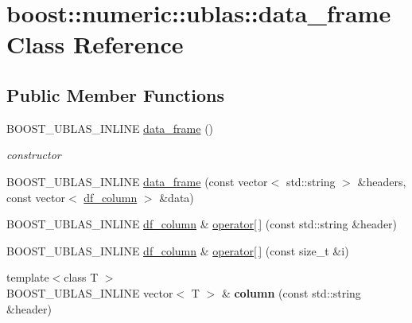 \hypertarget{classboost_1_1numeric_1_1ublas_1_1data__frame}{}\section{boost\+:\+:numeric\+:\+:ublas\+:\+:data\+\_\+frame Class Reference}
\label{classboost_1_1numeric_1_1ublas_1_1data__frame}
\subsection*{Public Member Functions}
\begin{DoxyCompactItemize}
\item 
B\+O\+O\+S\+T\+\_\+\+U\+B\+L\+A\+S\+\_\+\+I\+N\+L\+I\+NE \hyperlink{classboost_1_1numeric_1_1ublas_1_1data__frame_a1fe0c252f16d65762717c1da13432e8f}{data\+\_\+frame} ()\hypertarget{classboost_1_1numeric_1_1ublas_1_1data__frame_a1fe0c252f16d65762717c1da13432e8f}{}\label{classboost_1_1numeric_1_1ublas_1_1data__frame_a1fe0c252f16d65762717c1da13432e8f}

\begin{DoxyCompactList}\small\item\em constructor \end{DoxyCompactList}\item 
B\+O\+O\+S\+T\+\_\+\+U\+B\+L\+A\+S\+\_\+\+I\+N\+L\+I\+NE \hyperlink{classboost_1_1numeric_1_1ublas_1_1data__frame_a1cfb2a3083283f2aceff85649120ce61}{data\+\_\+frame} (const vector$<$ std\+::string $>$ \&headers, const vector$<$ \hyperlink{classboost_1_1numeric_1_1ublas_1_1df__column}{df\+\_\+column} $>$ \&data)
\item 
B\+O\+O\+S\+T\+\_\+\+U\+B\+L\+A\+S\+\_\+\+I\+N\+L\+I\+NE \hyperlink{classboost_1_1numeric_1_1ublas_1_1df__column}{df\+\_\+column} \& \hyperlink{classboost_1_1numeric_1_1ublas_1_1data__frame_a7bc6a73935b5d7f0dbdfffdcdae841dd}{operator\mbox{[}$\,$\mbox{]}} (const std\+::string \&header)
\item 
B\+O\+O\+S\+T\+\_\+\+U\+B\+L\+A\+S\+\_\+\+I\+N\+L\+I\+NE \hyperlink{classboost_1_1numeric_1_1ublas_1_1df__column}{df\+\_\+column} \& \hyperlink{classboost_1_1numeric_1_1ublas_1_1data__frame_a58496ee7ebcb0c67457b2c0c476ecec4}{operator\mbox{[}$\,$\mbox{]}} (const size\+\_\+t \&i)
\item 
{\footnotesize template$<$class T $>$ }\\B\+O\+O\+S\+T\+\_\+\+U\+B\+L\+A\+S\+\_\+\+I\+N\+L\+I\+NE vector$<$ T $>$ \& {\bfseries column} (const std\+::string \&header)\hypertarget{classboost_1_1numeric_1_1ublas_1_1data__frame_a261a6b02e41c2d5c3e17c7a91c5cb2d5}{}\label{classboost_1_1numeric_1_1ublas_1_1data__frame_a261a6b02e41c2d5c3e17c7a91c5cb2d5}


\end{DoxyCompactItemize}
